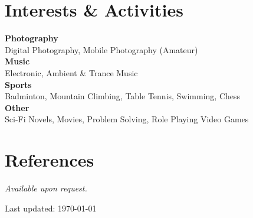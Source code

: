 \documentclass[margin,line]{resume}
\begin{document}
\begin{resume}
    \section{\mysidestyle Interests \& Activities}
    {\bf Photography} \vspace{1mm}\\
    Digital Photography, Mobile Photography (Amateur)\vspace{1mm}\\
    {\bf Music} \vspace{1mm}\\
    Electronic, Ambient \& Trance Music \vspace{1mm}\\
    {\bf Sports} \vspace{1mm}\\
    Badminton, Mountain Climbing, Table Tennis, Swimming, Chess \vspace{1mm}\\
    {\bf Other} \vspace{1mm}\\
    Sci-Fi Novels, Movies, Problem Solving, Role Playing Video Games    
    
    \section{\mysidestyle References} 

    {\sl Available upon request.}


\begin{center}
\begin{footnotesize}
Last updated: \today \\
\end{footnotesize}
\end{center}

\end{resume}
\end{document}
